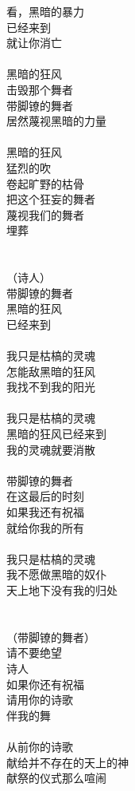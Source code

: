 看，黑暗的暴力\\
已经来到\\
就让你消亡\\
\\
黑暗的狂风\\
击毁那个舞者\\
带脚镣的舞者\\
居然蔑视黑暗的力量\\
\\
黑暗的狂风\\
猛烈的吹\\
卷起旷野的枯骨\\
把这个狂妄的舞者\\
蔑视我们的舞者\\
埋葬\\
\\
\\
（诗人）\\
带脚镣的舞者\\
黑暗的狂风\\
已经来到\\
\\
我只是枯槁的灵魂\\
怎能敌黑暗的狂风\\
我找不到我的阳光\\
\\
我只是枯槁的灵魂\\
黑暗的狂风已经来到\\
我的灵魂就要消散\\
\\
带脚镣的舞者\\
在这最后的时刻\\
如果我还有祝福\\
就给你我的所有\\
\\
我只是枯槁的灵魂\\
我不愿做黑暗的奴仆\\
天上地下没有我的归处\\
\\
\\
（带脚镣的舞者）\\
请不要绝望\\
诗人\\
如果你还有祝福\\
请用你的诗歌\\
伴我的舞\\
\\
从前你的诗歌\\
献给并不存在的天上的神\\
献祭的仪式那么喧闹\\
